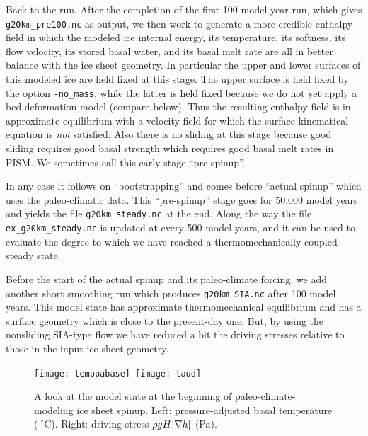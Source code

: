 Back to the run.  After the completion of the first 100 model year run, which gives \texttt{g20km_pre100.nc} as output, we then work to generate a more-credible enthalpy field in which the modeled ice internal energy, its temperature, its softness, its flow velocity, its stored basal water, and its basal melt rate are all in better balance with the ice sheet geometry.  In particular the upper and lower surfaces of this modeled ice are held fixed at this stage.  The upper surface is held fixed by the option \texttt{-no_mass}, while the latter is held fixed because we do not yet apply a bed deformation model (compare below).  Thus the resulting enthalpy field is in approximate equilibrium with a velocity field for which the surface kinematical equation \cite{Fowler} is \emph{not} satisfied.  Also there is no sliding at this stage because good sliding requires good basal strength which requires good basal melt rates in PISM.  We sometimes call this early stage ``pre-spinup''.

In any case it follows on ``bootstrapping'' and comes before ``actual spinup'' which uses the paleo-climatic data.  This ``pre-spinup'' stage goes for 50,000 model years and yields the file \texttt{g20km_steady.nc} at the end.  Along the way the file \texttt{ex_g20km_steady.nc} is updated at every 500 model years, and it can be used to evaluate the degree to which we have reached a thermomechanically-coupled steady state.

Before the start of the actual spinup and its paleo-climate forcing, we add another short smoothing run which produces \texttt{g20km_SIA.nc} after 100 model years.  This model state has approximate thermomechanical equilibrium and has a surface geometry which is close to the present-day one.  But, by using the nonsliding SIA-type flow we have reduced a bit the driving stresses relative to those in the input ice sheet geometry.

\begin{figure}[ht]
\centering
\mbox{\texttt{[image: temppabase]}
  \qquad \texttt{[image: taud]}}
\caption{A look at the model state at the beginning of paleo-climate-modeling ice sheet spinup.  Left: pressure-adjusted basal temperature ($\phantom{|}^\circ$C).  Right: driving stress $\rho g H |\nabla h|$ (Pa).}
\label{fig:sr-spinstart}
\end{figure}

